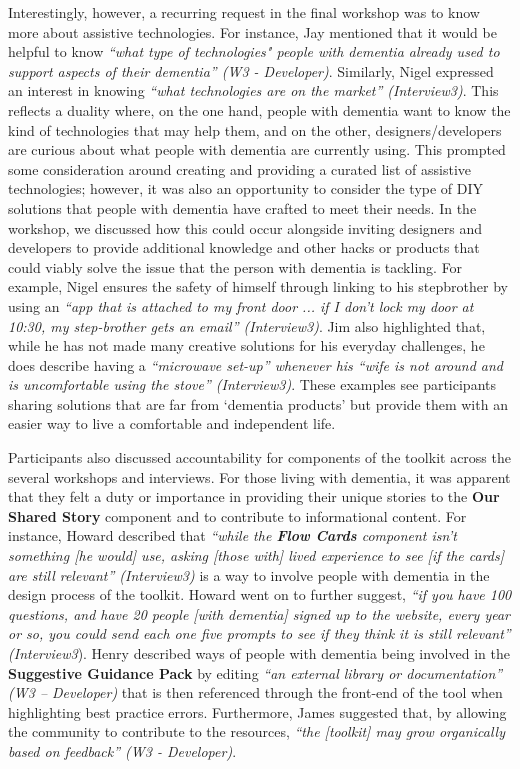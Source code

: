 Interestingly, however, a recurring request in the final workshop was to know more about assistive technologies. For instance, Jay mentioned that it would be helpful to know \textit{``what type of technologies" people with dementia already used to support aspects of their dementia'' (W3 - Developer)}. Similarly, Nigel expressed an interest in knowing \textit{``what technologies are on the market'' (Interview3)}. This reflects a duality where, on the one hand, people with dementia want to know the kind of technologies that may help them, and on the other, designers/developers are curious about what people with dementia are currently using. This prompted some consideration around creating and providing a curated list of assistive technologies; however, it was also an opportunity to consider the type of DIY solutions that people with dementia have crafted to meet their needs. In the workshop, we discussed how this could occur alongside inviting designers and developers to provide additional knowledge and other hacks or products that could viably solve the issue that the person with dementia is tackling. For example, Nigel ensures the safety of himself through linking to his stepbrother by using an \textit{``app that is attached to my front door ... if I don’t lock my door at 10:30, my step-brother gets an email'' (Interview3)}. Jim also highlighted that, while he has not made many creative solutions for his everyday challenges, he does describe having a \textit{``microwave set-up” whenever his \textit{``wife is not around and is uncomfortable using the stove'' (Interview3)}}. These examples see participants sharing solutions that are far from ‘dementia products’ but provide them with an easier way to live a comfortable and independent life.

Participants also discussed accountability for components of the toolkit across the several workshops and interviews. For those living with dementia, it was apparent that they felt a duty or importance in providing their unique stories to the \textbf{Our Shared Story} component and to contribute to informational content. For instance, Howard described that \textit{``while the \textbf{Flow Cards} component isn't something [he would] use, asking [those with] lived experience to see [if the cards] are still relevant'' (Interview3)} is a way to involve people with dementia in the design process of the toolkit. Howard went on to further suggest, \textit{``if you have 100 questions, and have 20 people [with dementia] signed up to the website, every year or so, you could send each one five prompts to see if they think it is still relevant'' (Interview3}). Henry described ways of people with dementia being involved in the \textbf{Suggestive Guidance Pack} by editing \textit{``an external library or documentation'' (W3 – Developer)} that is then referenced through the front-end of the tool when highlighting best practice errors. Furthermore, James suggested that, by allowing the community to contribute to the resources, \textit{``the [toolkit] may grow organically based on feedback'' (W3 - Developer)}. 

